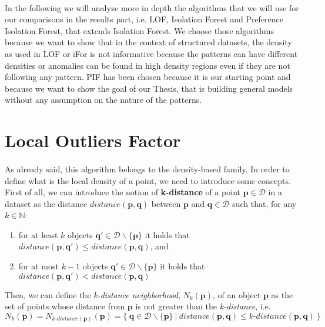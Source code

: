 \begin{itemize}
\end{itemize}

\paragraph{}
In the following we will analyze more in depth the algorithms that we will use for our comparisons in the results part, i.e. LOF, Isolation Forest and Preference Isolation Forest, that extends Isolation Forest. \newline
We choose those algorithms because we want to show that in the context of structured datasets, the density as used in LOF or iFor is not informative because the patterns can have different densities or anomalies can be found in high density regions even if they are not following any pattern. PIF has been chosen because it is our starting point and because we want to show the goal of our Thesis, that is building general models without any assumption on the nature of the patterns.

\section{Local Outliers Factor}
\label{sec:lof}
\paragraph{}
As already said, this algorithm belongs to the density-based family. In order to define what is the local density of a point, we need to introduce some concepts. \newline
First of all, we can introduce the notion of \textbf{k-distance} of a point $\textbf{p} \in \mathcal{D}$ in a dataset as the distance $distance(\textbf{p}, \textbf{q})$ between $\textbf{p}$ and $\textbf{q} \in \mathcal{D}$ such that, for any $k \in \mathbb{N}$:
\begin{enumerate}[label=(\roman*)]
    \item for at least $k$ objects $\textbf{q}' \in \mathcal{D} \backslash \{\textbf{p}\}$ it holds that $distance(\textbf{p}, \textbf{q}') \leq distance(\textbf{p}, \textbf{q})$, and
    \item for at most $k-1$ objects $\textbf{q}' \in \mathcal{D} \backslash \{\textbf{p}\}$ it holds that $distance(\textbf{p}, \textbf{q}') < distance(\textbf{p}, \textbf{q})$
\end{enumerate}
Then, we can define the \textit{k-distance neighborhood}, $N_k(\textbf{p})$, of an object $\textbf{p}$ as the set of points whose distance from $\textbf{p}$ is not greater than the \textit{k-distance}, i.e. 
\begin{equation}
    N_k(\textbf{p}) = N_{\textit{k-distance}(\textbf{p})}(\textbf{p}) = \{\ \textbf{q} \in \mathcal{D} \backslash \{\textbf{p}\}\ |\ distance(\textbf{p}, \textbf{q}) \leq \textit{k-distance}(\textbf{p}, \textbf{q})\ \}
\end{equation}

